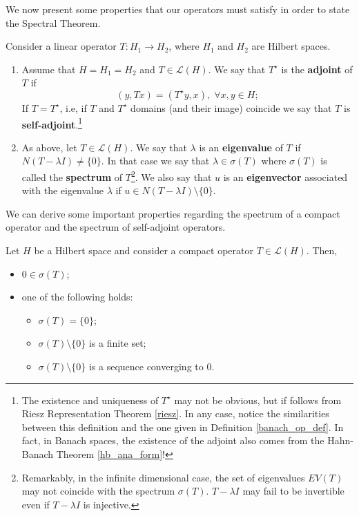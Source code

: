 We now present some properties that our operators must satisfy in order to state the Spectral Theorem.
\begin{definition}
    Consider a linear operator \(T: H_1 \rightarrow H_2\), where \(H_1\) and \(H_2\) are Hilbert spaces.
    \begin{enumerate}
        \item Assume that \(H = H_1=H_2\) and \(T \in \mathcal{L}(H)\). We say that \(T^\star\) is the \textbf{adjoint} of \(T\) if
        \[
        (y, T x) = (T^\star y, x), \; \forall x, y \in H;
        \]
        If \(T=T^\star\), i.e, if \(T\) and \(T^\star\) domains (and their image) coincide we say that \(T\) is \textbf{self-adjoint}.\footnote{The existence and uniqueness of \(T^\star\) may not be obvious, but if follows from Riesz Representation Theorem \eqref{riesz}. In any case, notice the similarities between this definition and the one given in Definition \eqref{banach_op_def}. In fact, in Banach spaces, the existence of the adjoint also comes from the Hahn-Banach Theorem \eqref{hb_ana_form}!}
        \item As above, let \(T \in \mathcal{L}(H)\). We say that \(\lambda\) is an \textbf{eigenvalue} of \(T\) if \(N(T - \lambda I) \neq \{0\}\). In that case we say that \(\lambda \in \sigma(T)\) where \(\sigma(T)\) is called the \textbf{spectrum} of \(T\)\footnote{Remarkably, in the infinite dimensional case, the set of eigenvalues \(EV(T)\) may not coincide with the spectrum \(\sigma(T)\). \(T - \lambda I\) may fail to be invertible even if \(T - \lambda I\) is injective.}. We also say that \(u\) is an \textbf{eigenvector} associated with the eigenvalue \(\lambda\) if \(u \in N(T-\lambda I)\setminus \{0\}\).
    \end{enumerate}
\end{definition}
We can derive some important properties regarding the spectrum of a compact operator and the spectrum of self-adjoint operators.
\begin{proposition}
    Let \(H\) be a Hilbert space and consider a compact operator \(T \in \mathcal{L}(H)\). Then,
    \begin{itemize}
        \item \(0 \in \sigma(T)\);
        \item one of the following holds:
        \begin{itemize}
            \item \(\sigma(T) = \{0\}\);
            \item \(\sigma(T)\setminus\{0\}\) is a finite set;
            \item \(\sigma(T)\setminus\{0\}\) is a sequence converging to \(0\).
        \end{itemize} 
    \end{itemize}
\end{proposition}
